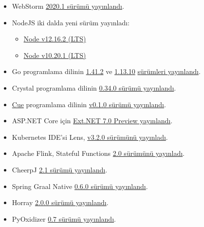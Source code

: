 \documentclass[11pt]{article}
\begin{document}
\begin{itemize}
\item WebStorm \href{https://blog.jetbrains.com/webstorm/2020/04/webstorm-2020-1/}{2020.1 sürümü yayınlandı}.
\item NodeJS iki dalda yeni sürüm yayınladı:
\begin{itemize}
\item \href{https://nodejs.org/en/blog/release/v12.16.2/}{Node v12.16.2 (LTS)}
\item \href{https://nodejs.org/en/blog/release/v10.20.1/}{Node v10.20.1 (LTS)}
\end{itemize}
\item Go programlama dilinin \href{https://golang.org/doc/devel/release.html\#go1.14.minor}{1.41.2} ve \href{https://golang.org/doc/devel/release.html\#go1.13.minor}{1.13.10} \href{https://groups.google.com/forum/m/\#!msg/golang-announce/9UJN3gwMzhY/HVdQFNOVBgAJ}{sürümleri yayınlandı}.
\item Crystal programlama dilinin \href{https://crystal-lang.org/2020/04/06/crystal-0.34.0-released.html}{0.34.0 sürümü yayınlandı}.
\item \href{https://cuelang.org/}{Cue} programlama dilinin \href{https://github.com/cuelang/cue/releases/tag/v0.1.0}{v0.1.0 sürümü yayınlandı}.
\item ASP.NET Core için \href{https://ext.net/v7-0-preview-for-asp-net-core/}{Ext.NET 7.0 Preview yayınlandı}.
\item Kubernetes IDE'si Lens, \href{https://github.com/lensapp/lens/releases/tag/v3.2.0}{v3.2.0 sürümünü yayınladı}.
\item Apache Flink, Stateful Functions \href{https://flink.apache.org/news/2020/04/07/release-statefun-2.0.0.html}{2.0 sürümünü yayınladı}.
\item CheerpJ \href{https://medium.com/leaningtech/cheerpj-2-1-released-java-bytecode-to-webassembly-and-javascript-303fb8dd5d98}{2.1 sürümü yayınlandı}.
\item Spring Graal Native \href{https://spring.io/blog/2020/04/09/spring-graal-native-0-6-0-released}{0.6.0 sürümü yayınlandı}.
\item Horray \href{https://www.freerdp.com/2020/04/09/2\_0\_0-released}{2.0.0 sürümü yayınlandı}.
\item PyOxidizer \href{https://gregoryszorc.com/blog/2020/04/09/pyoxidizer-0.7/}{0.7 sürümü yayınlandı}.
\end{itemize}
\end{document}
